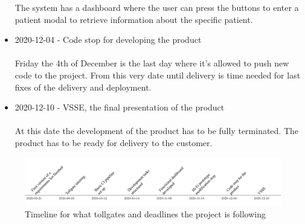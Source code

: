 \begin{itemize}
    The system has a dashboard where the user can press the buttons to enter a patient modal to retrieve information about the specific patient. 
    \item 2020-12-04 - Code stop for developing the product\\ \\
    Friday the 4th of December is the last day where it's allowed to push new code to the project. From this very date until delivery is time needed for last fixes of the delivery and deployment.
    \item 2020-12-10 - VSSE, the final presentation of the product\\ \\
    At this date the development of the product has to be fully terminated. The product has to be ready for delivery to the customer. 
\end{itemize}   

\begin{figure}[hbt!]
\centering
\includegraphics[width=\linewidth]{Pictures/timeline.PNG}
\caption{Timeline for what tollgates and deadlines the project is following}
\label{fig:timeline}
\end{figure}

